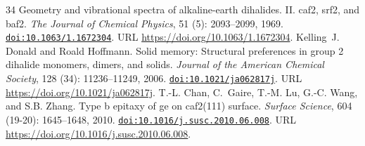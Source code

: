 \documentclass[11pt,a4paper]{article}
\theoremstyle{plain}
\theoremstyle{definition}
\theoremstyle{remark}
\providecommand{\doi}[1]{\href{https://doi.org/#1}{\texttt{doi:#1}}}
\begin{document}
\begin{thebibliography}{34}
\newblock Geometry and vibrational spectra of alkaline-earth dihalides. {II}.
  caf2, srf2, and baf2.
\newblock \emph{The Journal of Chemical Physics}, 51 (5):
  2093--2099, 1969.
\newblock \doi{10.1063/1.1672304}.
\newblock URL \url{https://doi.org/10.1063/1.1672304}.
Kelling~J. Donald and Roald Hoffmann.
\newblock Solid memory: Structural preferences in group 2 dihalide monomers,
  dimers, and solids.
\newblock \emph{Journal of the American Chemical Society}, 128
  (34): 11236--11249, 2006.
\newblock \doi{10.1021/ja062817j}.
\newblock URL \url{https://doi.org/10.1021/ja062817j}.
T.-L. Chan, C.~Gaire, T.-M. Lu, G.-C. Wang, and S.B. Zhang.
\newblock Type b epitaxy of ge on caf2(111) surface.
\newblock \emph{Surface Science}, 604 (19-20): 1645--1648,
  2010.
\newblock \doi{10.1016/j.susc.2010.06.008}.
\newblock URL \url{https://doi.org/10.1016/j.susc.2010.06.008}.
\end{thebibliography}
\end{document}
